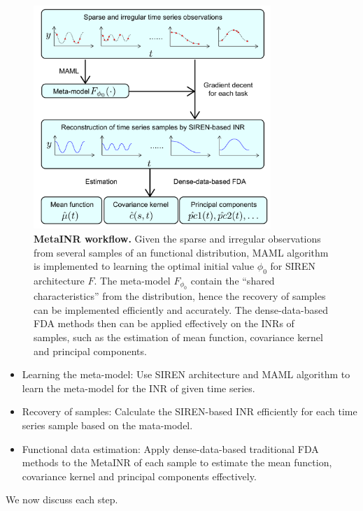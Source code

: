 \documentclass{article}
\begin{document}
\begin{figure}[htb]
  \centering
  \includegraphics[width=0.8\textwidth]{illustration.pdf}
  \caption{\textbf{MetaINR workflow.} Given the sparse and irregular observations from several samples of an functional distribution, MAML algorithm is implemented to learning the optimal initial value $\phi_0$ for SIREN architecture $F$. The meta-model $F_{\phi_0}$ contain the ``shared characteristics'' from the distribution, hence the recovery of samples can be implemented efficiently and accurately.
  The dense-data-based FDA methods then can be applied effectively on the INRs of samples, such as the estimation of mean function, covariance kernel and principal components.}
  \label{MetaINR workflow}
\end{figure}


\begin{itemize}
  \item Learning the meta-model: Use SIREN architecture and MAML algorithm to learn the meta-model for the INR of given time series.
  \item Recovery of samples: Calculate the SIREN-based INR efficiently for each time series sample based on the mata-model.
  \item Functional data estimation: Apply dense-data-based traditional FDA methods to the MetaINR of each sample to estimate the mean function, covariance kernel and principal components effectively.
\end{itemize}



We now discuss each step.
\end{document}
